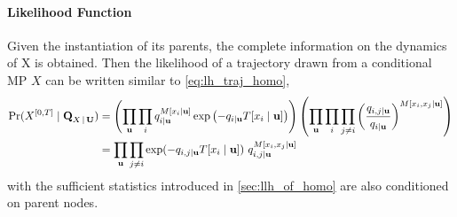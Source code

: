 \paragraph*{Likelihood Function}
Given the instantiation of its parents, the complete information on the dynamics of X is obtained. Then the likelihood of a trajectory drawn from a conditional MP $ X $ can be written similar to \autoref{eq:lh_traj_homo},
\begin{align}
\operatorname{Pr}(X^{[0,T]}  \mid \textbf{Q}_{X\,|\, \textbf{U}}) &=  \left(\prod_{ \textbf{u}}\prod_{ i} q_{i\mid \textbf{u}}^{M[x_{i}\mid \textbf{u}]} \exp \left(-q_{i\mid \textbf{u}} T[x_{i}\mid \textbf{u}]\right)\right)\left(\prod_{ \textbf{u}}\prod_{ i} \prod_{ j \neq i} \left(\frac{q_{i,j\mid \textbf{u}}}{q_{i\mid \textbf{u}}}\right)^{M\left[x_{i}, x_{j}\mid \textbf{u}\right]}\right) \nonumber\\ & = \prod_{ \textbf{u}}\prod_{j\neq i}  \exp(-q_{i,j\mid \textbf{u}}T[x_{i}\mid \textbf{u}]) \ q_{i,j\mid \textbf{u}}^{M[x_{i},x_{j}\mid \textbf{u}]}
\label{eq:lh_traj_cond}
\end{align}
with the sufficient statistics introduced in \cref{sec:llh_of_homo} are also conditioned on parent nodes.


